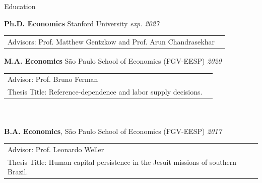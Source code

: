 \documentclass{resume} %
\begin{document}
\begin{rSection}{Education}

{\bf Ph.D. Economics} Stanford University \hfill {\em exp. 2027}
\begin{tabular}{ll}
    Advisors: Prof. Matthew Gentzkow and Prof. Arun Chandrasekhar
\end{tabular}

{\bf M.A. Economics} São Paulo School of Economics (FGV-EESP) \hfill {\em 2020} \\
\begin{tabular}{ll}
    Advisor: Prof. Bruno Ferman  \\
    Thesis Title: Reference-dependence and labor supply decisions.
\end{tabular} \\
\\{\bf B.A. Economics}, São Paulo School of Economics (FGV-EESP) \hfill {\em 2017}
\\
\begin{tabular}{l}
    Advisor: Prof. Leonardo Weller  \\
    Thesis Title: Human capital persistence in the Jesuit missions of southern Brazil.
\end{tabular} \\

\end{rSection}
\end{document}
